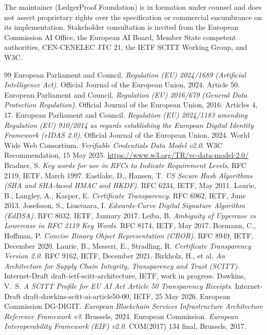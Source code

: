 \documentclass[11pt,a4paper]{article}
\begin{document}
The maintainer (LedgerProof Foundation) is in formation under counsel and does not assert proprietary rights over the specification or commercial encumbrance on its implementation. Stakeholder consultation is invited from the European Commission AI Office, the European AI Board, Member State competent authorities, CEN-CENELEC JTC 21, the IETF SCITT Working Group, and W3C.

\begin{thebibliography}{99}
 European Parliament and Council. \emph{Regulation (EU) 2024/1689 (Artificial Intelligence Act)}. Official Journal of the European Union, 2024. Article 50.
 European Parliament and Council. \emph{Regulation (EU) 2016/679 (General Data Protection Regulation)}. Official Journal of the European Union, 2016. Articles 4, 17.
 European Parliament and Council. \emph{Regulation (EU) 2024/1183 amending Regulation (EU) 910/2014 as regards establishing the European Digital Identity Framework (eIDAS 2.0)}. Official Journal of the European Union, 2024.
 World Wide Web Consortium. \emph{Verifiable Credentials Data Model v2.0}. W3C Recommendation, 15 May 2025. \url{https://www.w3.org/TR/vc-data-model-2.0/}
 Bradner, S. \emph{Key words for use in RFCs to Indicate Requirement Levels}. RFC 2119, IETF, March 1997.
 Eastlake, D., Hansen, T. \emph{US Secure Hash Algorithms (SHA and SHA-based HMAC and HKDF)}. RFC 6234, IETF, May 2011.
 Laurie, B., Langley, A., Kasper, E. \emph{Certificate Transparency}. RFC 6962, IETF, June 2013.
 Josefsson, S., Liusvaara, I. \emph{Edwards-Curve Digital Signature Algorithm (EdDSA)}. RFC 8032, IETF, January 2017.
 Leiba, B. \emph{Ambiguity of Uppercase vs Lowercase in RFC 2119 Key Words}. RFC 8174, IETF, May 2017.
 Bormann, C., Hoffman, P. \emph{Concise Binary Object Representation (CBOR)}. RFC 8949, IETF, December 2020.
 Laurie, B., Messeri, E., Stradling, R. \emph{Certificate Transparency Version 2.0}. RFC 9162, IETF, December 2021.
 Birkholz, H., et al. \emph{An Architecture for Supply Chain Integrity, Transparency and Trust (SCITT)}. Internet-Draft draft-ietf-scitt-architecture, IETF, work in progress.
 Dawkins, V.\ S. \emph{A SCITT Profile for EU AI Act Article 50 Transparency Receipts}. Internet-Draft draft-dawkins-scitt-ai-article50-00, IETF, 25 May 2026.
 European Commission DG-DIGIT. \emph{European Blockchain Services Infrastructure Architecture Reference Framework v3}. Brussels, 2024.
 European Commission. \emph{European Interoperability Framework (EIF) v2.0}. COM(2017) 134 final, Brussels, 2017.
\end{thebibliography}
\end{document}

